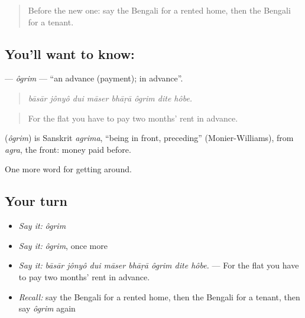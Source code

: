 \label{lesson:BN-C408-ogrim}



\begin{quote}
Before the new one: say the Bengali for a rented home, then the Bengali for a tenant.
\end{quote}

\subsection*{You'll want to know: }
\textbf{} — \emph{ôgrim} — \textquotedblleft{}an advance (payment); in advance\textquotedblright{}.

\begin{quote}
       
\end{quote}

\begin{quote}
\emph{bāsār jônyô dui māser bhāṛā ôgrim dite hôbe.}
\end{quote}

\begin{quote}
For the flat you have to pay two months' rent in advance.
\end{quote}

\begin{cousinweb}
\textbf{} (\emph{ôgrim}) is Sanskrit \emph{agrima}, \textquotedblleft{}being in front, preceding\textquotedblright{} (Monier-Williams), from \emph{agra}, the front: money paid before.
\end{cousinweb}

\begin{grammarlens}[title={What you've built}]
One more word for getting around.
\end{grammarlens}

\subsection*{Your turn}
\begin{itemize}
\raggedright
  \item \emph{Say it:} \emph{ôgrim}
  \item \emph{Say it:} \emph{ôgrim}, once more
  \item \emph{Say it:} \emph{bāsār jônyô dui māser bhāṛā ôgrim dite hôbe.} — For the flat you have to pay two months' rent in advance.
  \item \emph{Recall:} say the Bengali for a rented home, then the Bengali for a tenant, then say \emph{ôgrim} again
\end{itemize}

